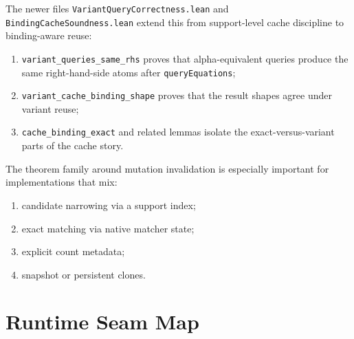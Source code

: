 \documentclass[11pt]{article}
\newcommand{\code}[1]{\texttt{#1}}
\begin{document}
The newer files \code{VariantQueryCorrectness.lean} and
\code{BindingCacheSoundness.lean} extend this from support-level cache
discipline to binding-aware reuse:
\begin{enumerate}
\item \texttt{variant\_queries\_same\_rhs} proves that
  alpha-equivalent queries produce the same right-hand-side atoms after
  \code{queryEquations};
\item \texttt{variant\_cache\_binding\_shape} proves that the result
  shapes agree under variant reuse;
\item \texttt{cache\_binding\_exact} and related lemmas isolate the
  exact-versus-variant parts of the cache story.
\end{enumerate}

The theorem family around mutation invalidation is especially important
for implementations that mix:
\begin{enumerate}
\item candidate narrowing via a support index;
\item exact matching via native matcher state;
\item explicit count metadata;
\item snapshot or persistent clones.
\end{enumerate}

\section{Runtime Seam Map}
\end{document}
